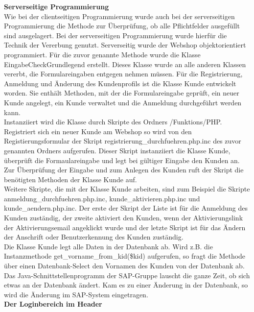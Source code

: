 \textbf{Serverseitige Programmierung}\\
Wie bei der clientseitigen Programmierung wurde auch bei der serverseitigen Programmierung die Methode zur Überprüfung, ob alle Pflichtfelder ausgefüllt sind ausgelagert. Bei der serverseitigen Programmierung wurde hierfür die Technik der Vererbung genutzt. Serverseitig wurde der Webshop objektorientiert programmiert. Für die zuvor genannte Methode wurde die Klasse \glqq EingabeCheckGrundlegend\grqq{} erstellt. Dieses Klasse wurde an alle anderen Klassen vererbt, die Formulareingaben entgegen nehmen müssen. Für die Registrierung, Anmeldung und Änderung des Kundenprofils ist die Klasse \glqq Kunde\grqq{} entwickelt worden. Sie enthält Methoden, mit der die Formulareingabe geprüft, ein neuer Kunde angelegt, ein Kunde verwaltet und die Anmeldung durchgeführt werden kann.\\
Instanziiert wird die Klasse durch Skripte des Ordners \glqq /Funktions/PHP\grqq{}. Registriert sich ein neuer Kunde am Webshop so wird von den Registierungsformular der Skript \glqq registrierung\_durchfuehren.php.inc\grqq{} des zuvor genannten Ordners aufgerufen. Dieser Skript instanziiert die Klasse \glqq Kunde\grqq{}, überprüft die Formaulareingabe und legt bei gültiger Eingabe den Kunden an. Zur Überprüfung der Eingabe und zum Anlegen des Kunden ruft der Skript die benötigten Methoden der Klasse \glqq Kunde\grqq{} auf.\\
Weitere Skripte, die mit der Klasse \glqq Kunde\grqq{} arbeiten, sind zum Beispiel die Skripte \glqq anmeldung\_durchfuehren.php.inc\grqq{}, \glqq kunde\_aktivieren.php.inc\grqq{} und \glqq kunde\_aendern.php.inc\grqq{}. Der erste der Skript der Liste ist für die Anmeldung des Kunden zuständig, der zweite aktiviert den Kunden, wenn der Aktivierungslink der Aktivierungsemail angeklickt wurde und der letzte Skript ist für das Ändern der Anschrift oder Benutzerkennung des Kunden zuständig.\\
Die Klasse \glqq Kunde\grqq{} legt alle Daten in der Datenbank ab. Wird z.B. die Instanzmethode \glqq get\_vorname\_from\_kid(\$kid)\grqq{} aufgerufen, so fragt die Methode über einen Datenbank-Select den Vornamen des Kunden von der Datenbank ab. Das Java-Schnittstellenprogramm der SAP-Gruppe lauscht die ganze Zeit, ob sich etwas an der Datenbank ändert. Kam es zu einer Änderung in der Datenbank, so wird die Änderung im SAP-System eingetragen.\\

\textbf{Der Loginbereich im Header}\\

